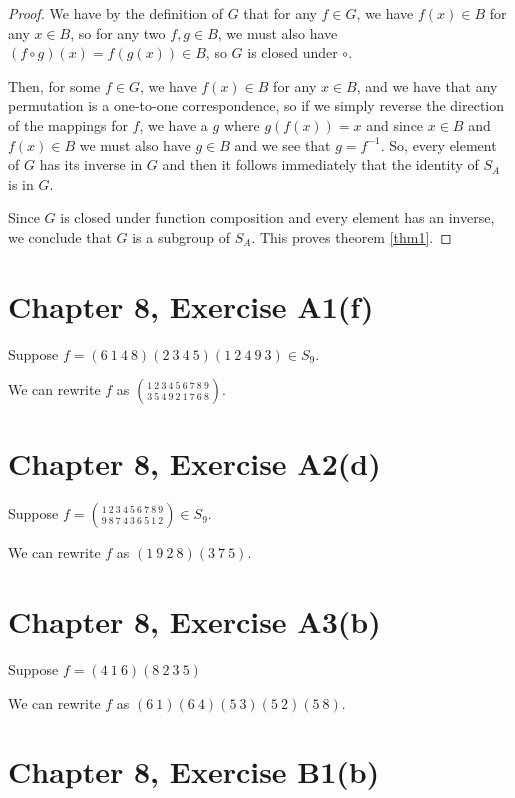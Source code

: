 \documentclass[12pt]{article}
\begin{document}
\begin{proof}
	We have by the definition of $G$ that for any $f \in G$,
	we have $f(x) \in B$ for any $x \in B$, so for any two
	$f,g \in B$, we must also have $(f \circ g)(x) = f(g(x)) \in B$,
	so $G$ is closed under $\circ$.

	Then, for some $f \in G$, we have $f(x) \in B$ for any $x \in B$,
	and we have that any permutation is a one-to-one correspondence,
	so if we simply reverse the direction of the mappings for $f$,
	we have a $g$ where $g(f(x)) = x$ and since $x \in B$ and $f(x) \in B$
	we must also have $g \in B$ and we see that $g = f^{-1}$.
	So, every element of $G$ has its inverse in $G$ and then
	it follows immediately that the identity of $S_A$ is in $G$.
	
	Since $G$ is closed under function composition and every element
	has an inverse, we conclude that $G$ is a subgroup of $S_A$.
	This proves theorem \ref{thm1}.
\end{proof}

\section{Chapter 8, Exercise A1(f)}

Suppose $f = (6\ 1\ 4\ 8)(2\ 3\ 4\ 5)(1\ 2\ 4\ 9\ 3) \in S_9$.

\medskip
\noindent We can rewrite $f$ as $\binom{1\ 2\ 3\ 4\ 5\ 6\ 7\ 8\ 9}{3\ 5\ 4\ 9\ 2\ 1\ 7\ 6\ 8}$.

\section{Chapter 8, Exercise A2(d)}

Suppose $f = \binom{1\ 2\ 3\ 4\ 5\ 6\ 7\ 8\ 9}{9\ 8\ 7\ 4\ 3\ 6\ 5\ 1\ 2} \in S_9$.

\medskip
\noindent We can rewrite $f$ as $(1\ 9\ 2\ 8)(3\ 7\ 5)$.

\section{Chapter 8, Exercise A3(b)}

Suppose $f = (4\ 1\ 6)(8\ 2\ 3\ 5)$

\medskip
\noindent We can rewrite $f$ as $(6\ 1)(6\ 4)(5\ 3)(5\ 2)(5\ 8)$.


\section{Chapter 8, Exercise B1(b)}
\end{document}

